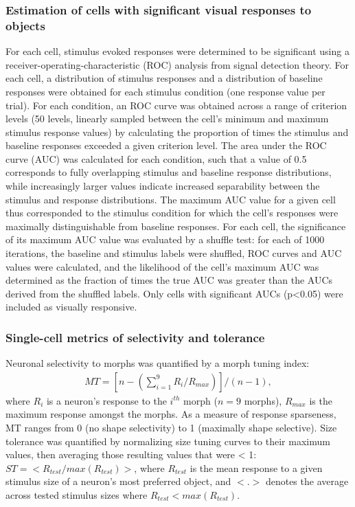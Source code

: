 \subsubsection{Estimation of cells with significant visual responses to objects}
For each cell, stimulus evoked responses were determined to be significant using a receiver-operating-characteristic (ROC) analysis from signal detection theory\cite{Green1966, Britten1992, Busse2011}. For each cell, a distribution of stimulus responses and a distribution of baseline responses were obtained for each stimulus condition (one response value per trial). For each condition, an ROC curve was obtained across a range of criterion levels (50 levels, linearly sampled between the cell's minimum and maximum stimulus response values) by calculating the proportion of times the stimulus and baseline responses exceeded a given criterion level. The area under the ROC curve (AUC) was calculated for each condition, such that a value of 0.5 corresponds to fully overlapping stimulus and baseline response distributions, while increasingly larger values indicate increased separability between the stimulus and response distributions. The maximum AUC value for a given cell thus corresponded to the stimulus condition for which the cell's responses were maximally distinguishable from baseline responses. For each cell, the significance of its maximum AUC value was evaluated by a shuffle test:  for each of 1000 iterations, the baseline and stimulus labels were shuffled, ROC curves and AUC values were calculated, and the likelihood of the cell's maximum AUC was determined as the fraction of times the true AUC was greater than the AUCs derived from the shuffled labels. Only cells with significant AUCs (p<0.05) were included as visually responsive. 

\subsubsection{Single-cell metrics of selectivity and tolerance}
Neuronal selectivity to morphs was quantified by a morph tuning index\cite{Zoccolan2007}:
\begin{align}
MT=[n-(\sum_{i=1}^{9}R_i/R_{max})]/(n-1), 
\end{align}
where $R_i$ is a neuron’s response to the $i^{th}$ morph ($n=9$ morphs), $R_{max}$ is the maximum response amongst the morphs. As a measure of response sparseness, MT ranges from 0 (no shape selectivity) to 1 (maximally shape selective). Size tolerance was quantified by normalizing size tuning curves to their maximum values, then averaging those resulting values that were < 1:  $ST=<R_{test}/max(R_{test})>$, where $R_{test}$ is the mean response to a given stimulus size of a neuron’s most preferred object, and $<.>$ denotes the average across tested stimulus sizes where $R_{test}<max(R_{test})$\cite{Zoccolan2007}. 


